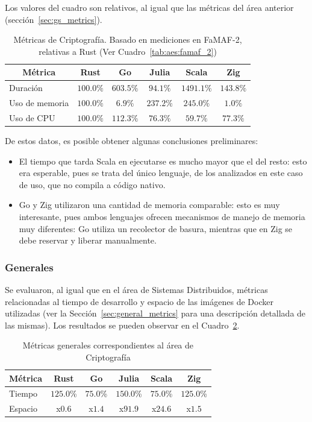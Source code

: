 \documentclass[11pt]{article}
\let\Oldsubsubsection\subsubsection
\renewcommand{\subsubsection}{\FloatBarrier\Oldsubsubsection}
\begin{document}
Los valores del cuadro son relativos, al igual que las métricas del área anterior (sección~\ref{sec:gs_metrics}).

\begin{table}[h]
\centering
\begin{tabular}{|l|c|c|c|c|c|}
\hline
\multicolumn{1}{|c|}{Métrica} & Rust & Go & Julia & Scala & Zig \\ \hline
Duración & $100.0\%$& $603.5\%$& $94.1\%$& $1491.1\%$& $143.8\%$\\ \hline
Uso de memoria & $100.0\%$& $6.9\%$& $237.2\%$& $245.0\%$& $1.0\%$\\ \hline
Uso de CPU & $100.0\%$& $112.3\%$& $76.3\%$& $59.7\%$& $77.3\%$\\ \hline
\end{tabular}
\caption{Métricas de Criptografía. Basado en mediciones en FaMAF-2, relativas a Rust  (Ver Cuadro~\ref{tab:aes:famaf_2})}
\label{tab:aes:metrics}
\end{table}

De estos datos, es posible obtener algunas conclusiones preliminares:

\begin{itemize}
    \item El tiempo que tarda Scala en ejecutarse es mucho mayor que el del resto: esto era esperable, pues se trata del único lenguaje, de los analizados en este caso de uso, que no compila a código nativo.
    \item Go y Zig utilizaron una cantidad de memoria comparable: esto es muy interesante, pues ambos lenguajes ofrecen mecanismos de manejo de memoria muy diferentes: Go utiliza un recolector de basura, mientras que en Zig se debe reservar y liberar manualmente.
\end{itemize}

\subsubsection{Generales}

Se evaluaron, al igual que en el área de Sistemas Distribuidos, métricas relacionadas al tiempo de desarrollo y espacio de las imágenes de Docker utilizadas (ver la Sección~\ref{sec:general_metrics} para una descripción detallada de las mismas). Los resultados se pueden observar en el Cuadro~\ref{tab:aes:relative_general_metrics}.

\begin{table}[h]
\centering
\begin{tabular}{|l|c|c|c|c|c|}
\hline
\multicolumn{1}{|c|}{Métrica} & Rust & Go & Julia & Scala & Zig \\ \hline
Tiempo & $125.0$\% & $75.0$\% & $150.0$\% & $75.0$\% & $125.0$\% \\ \hline
Espacio & x$0.6$ & x$1.4$ & x$91.9$ & x$24.6$ & x$1.5$ \\ \hline
\end{tabular}
\caption{Métricas generales correspondientes al área de Criptografía}
\label{tab:aes:relative_general_metrics}
\end{table}
\end{document}
